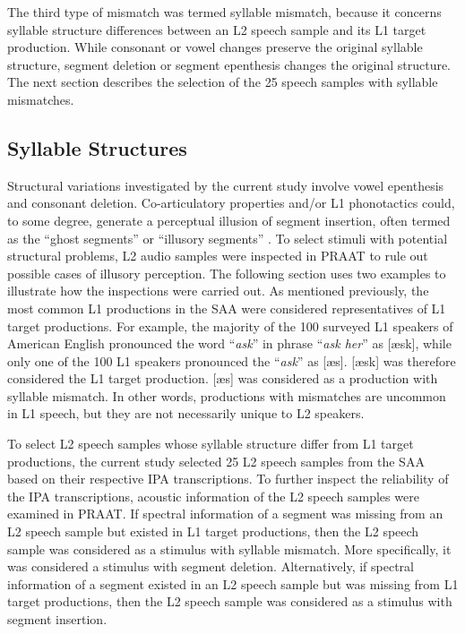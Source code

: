 The third type of mismatch was termed syllable mismatch, because it concerns syllable structure differences between an L2 speech sample and its L1 target production. While consonant or vowel changes preserve the original syllable structure, segment deletion or segment epenthesis changes the original structure. The next section describes the selection of the 25 speech samples with syllable mismatches.

\subsection{Syllable Structures}

Structural variations investigated by the current study involve vowel epenthesis and consonant deletion. Co-articulatory properties and/or L1 phonotactics could, to some degree, generate a perceptual illusion of segment insertion, often termed as the “ghost segments” or “illusory segments” \citep{Dupoux_1999}. To select stimuli with potential structural problems, L2 audio samples were inspected in PRAAT to rule out possible cases of illusory perception. The following section uses two examples to illustrate how the inspections were carried out. As mentioned previously, the most common L1 productions in the SAA were considered representatives of L1 target productions. For example, the majority of the 100 surveyed L1 speakers of American English pronounced the word “\textit{ask}” in phrase “\textit{ask her}” as [æsk], while only one of the 100 L1 speakers pronounced the “\textit{ask}” as [æs]. [æsk] was therefore considered the L1 target production. [æs] was considered as a production with syllable mismatch. In other words, productions with mismatches are uncommon in L1 speech, but they are not necessarily unique to L2 speakers. 

To select L2 speech samples whose syllable structure differ from L1 target productions, the current study selected 25 L2 speech samples from the SAA based on their respective IPA transcriptions. To further inspect the reliability of the IPA transcriptions, acoustic information of the L2 speech samples were examined in PRAAT. If spectral information of a segment was missing from an L2 speech sample but existed in L1 target productions, then the L2 speech sample was considered as a stimulus with syllable mismatch. More specifically, it was considered a stimulus with segment deletion. Alternatively, if spectral information of a segment existed in an L2 speech sample but was missing from L1 target productions, then the L2 speech sample was considered as a stimulus with segment insertion.

